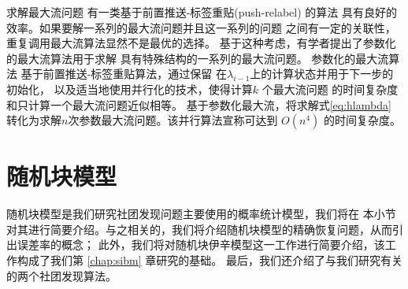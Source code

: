 %
%
%
求解最大流问题
有一类基于前置推送-标签重贴(push-relabel) \cite{Goldberg1988} 的算法
具有良好的效率。如果要解一系列的最大流问题并且这一系列的问题
之间有一定的关联性，重复调用最大流算法显然不是最优的选择。
基于这种考虑，有学者提出了参数化的最大流算法\cite{Gallo1989}用于求解
具有特殊结构的一系列的最大流问题。
%
%
参数化的最大流算法
基于前置推送-标签重贴算法，通过保留
在$\lambda_{i-1}$上的计算状态并用于下一步的初始化，
以及适当地使用并行化的技术，使得计算$k$ 个最大流问题
的时间复杂度和只计算一个最大流问题近似相等。
\citet{kolmogorov} 基于参数化最大流，将求解式\eqref{eq:hlambda}
转化为求解$n$次参数最大流问题。该并行算法宣称可达到 $O(n^4)$ 的时间复杂度。


\section{随机块模型}\label{sec:sbm}
随机块模型是我们研究社团发现问题主要使用的概率统计模型，我们将在
本小节对其进行简要介绍。与之相关的，我们将介绍随机块模型的精确恢复问题，从而引出误差率的概念；
此外，我们将对随机块伊辛模型这一工作进行简要介绍，该工作构成了我们第 \ref{chap:sibm} 章研究的基础。
最后，我们还介绍了与我们研究有关的两个社团发现算法。

